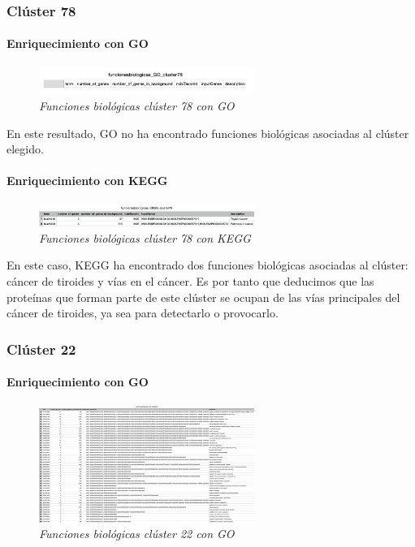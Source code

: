 \subsubsection{Clúster 78}

\paragraph{Enriquecimiento con GO}

\begin{figure}
	\centering
	\includegraphics[width=70mm,scale=1.2]{figures/cluster78_GO.png}
	\caption{\textit{Funciones biológicas clúster 78 con GO}}
\end{figure}

En este resultado, GO no ha encontrado funciones biológicas asociadas al clúster elegido.

\paragraph{Enriquecimiento con KEGG}

\begin{figure}
	\centering
	\includegraphics[width=70mm,scale=1.2]{figures/cluster78_KEGG.png}
	\caption{\textit{Funciones biológicas clúster 78 con KEGG}}
\end{figure}

En este caso, KEGG ha encontrado dos funciones biológicas asociadas al clúster: cáncer de tiroides y vías en el cáncer. Es por tanto que deducimos que las proteínas que forman parte de este clúster se ocupan de las vías principales del cáncer de tiroides, ya sea para detectarlo o provocarlo.

\subsubsection{Clúster 22}

\paragraph{Enriquecimiento con GO}

\begin{figure}
	\centering
	\includegraphics[width=70mm,scale=1.2]{figures/cluster22_GO.png}
	\caption{\textit{Funciones biológicas clúster 22 con GO}}
\end{figure}

